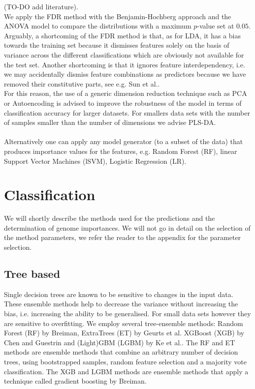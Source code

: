 \documentclass[a4paper,10pt]{article}
\begin{document}
(TO-DO add literature). \\
We apply the FDR method with the Benjamin-Hochberg approach and the ANOVA model to compare the distributions with a maximum $p$-value set at $0.05$. \\ %
%
Arguably, a shortcoming of the FDR method is that, as for LDA, it has a bias towards the training set because it dismisses features solely
on the basis of variance across the different classifications which are obviously not available for the test set. Another shortcoming is that it ignores
feature interdependency, i.e. we may accidentally dismiss feature combinations as predictors because we have removed their constitutive parts, see
e.g. Sun et al.\cite{Sun1996}. \\ 
%
For this reason, the use of a generic dimension reduction technique such as PCA or Autoencoding is advised to improve
the robustness of the model in terms of classification accuracy for larger datasets. For smallers data sets with the number of samples smaller
than the number of dimensions we advise PLS-DA. \\ \\
%
Alternatively one can apply any model generator (to a subset of the data) that produces importance values for the features, e.g. Random Forest (RF), linear Support
Vector Machines (lSVM), Logistic Regression (LR). 
\section{Classification}
%
We will shortly describe the methods used for the predictions and the determination of genome importances.
We will not go in detail on the selection of the method parameters, we refer the reader to the appendix for the
parameter selection.

\subsection{Tree based}

Single decision trees are known to be sensitive to changes in the input data. These ensemble methods 
help to decrease the variance without increasing the bias, i.e. increasing the ability to be generalised. For small
data sets however they are sensitive to overfitting. 
We employ several tree-ensemble methods: Random Forest (RF) by Breiman\cite{Breiman2001}, ExtraTrees (ET) by Geurts et al.\cite{Geurts2006} 
XGBoost (XGB) by Chen and Guestrin\cite{Chen2016} and (Light)GBM (LGBM) by Ke et al.\cite{Ke2017}.
The RF and ET methods are ensemble methods that combine an arbitrary number of decision trees, using bootstrapped samples,
random feature selection and a majority vote classification. The XGB and LGBM methods are ensemble methods 
that apply a technique called gradient boosting by Breiman\cite{Breiman1997}.
%
\end{document}
